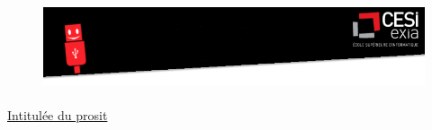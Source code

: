 \documentclass{article}
\makeatletter
\def\bigcenter{\trivlist \bigcentering\item\relax}
\def\bigcentering{\let\\\@centercr\rightskip\@bigflushglue%
\leftskip\@bigflushglue
\parindent\z@\parfillskip\z@skip}
\newcommand{\headers}{%
\begin{figure}[!h]
\centering
\vspace{-1.5cm}
\bigcenter
\includegraphics[scale=1.05]{Capture.PNG}
\end{figure}
}
\makeatother
\begin{document}
\headers

\huge
{}

\normalsize
\paragraph{}
\paragraph{}
\tableofcontents
\raggedright
\paragraph{}

\href{google}{\color{blue}Intitulée du prosit} 
\end{document}
